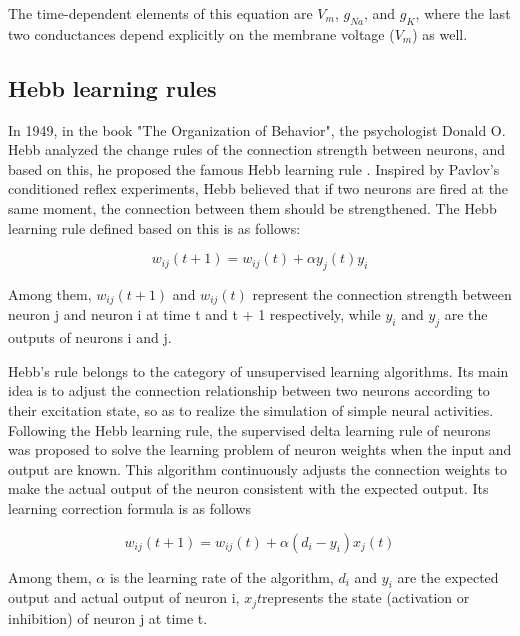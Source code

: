 \documentclass[paper=a4, fontsize=11pt]{scrartcl} %
\numberwithin{equation}{section} %
\numberwithin{figure}{section} %
\numberwithin{table}{section} %
\begin{document}
The time-dependent elements of this equation are \( V_{m} \), \( g_{Na} \), and \( g_{K} \), where the last two conductances depend explicitly on the membrane voltage (\( V_{m} \)) as well.

\subsection{Hebb learning rules}
In 1949, in the book "The Organization of Behavior", the psychologist Donald O. Hebb analyzed the change rules of the connection strength between neurons, and based on this, he proposed the famous Hebb learning rule \cite{Hebb2002OrganizationBehaviorNeuropsychological}. Inspired by Pavlov's conditioned reflex experiments, Hebb believed that if two neurons are fired at the same moment, the connection between them should be strengthened. The Hebb learning rule defined based on this is as follows:

\begin{equation}
    w_{ij}(t + 1) = w_{ij}(t) + \alpha y_j(t)y_i
\end{equation}

Among them, $w_{ij}(t+1)$ and $w_{ij}(t)$ represent the connection strength between neuron j and neuron i at time t and t + 1 respectively, while $y_i$ and $y_j$ are the outputs of neurons i and j.


Hebb's rule belongs to the category of unsupervised learning algorithms. Its main idea is to adjust the connection relationship between two neurons according to their excitation state, so as to realize the simulation of simple neural activities. Following the Hebb learning rule, the supervised delta learning rule of neurons was proposed to solve the learning problem of neuron weights when the input and output are known. This algorithm continuously adjusts the connection weights to make the actual output of the neuron consistent with the expected output. Its learning correction formula is as follows


\begin{equation}
    w_{ij}(t + 1) = w_{ij}(t) + \alpha(d_i - y_i)x_j(t)
\end{equation}

Among them, $\alpha$ is the learning rate of the algorithm, $d_i$ and $y_i$ are the expected output and actual output of neuron i, $x_j{t}$represents the state (activation or inhibition) of neuron j at time t.
\end{document}
